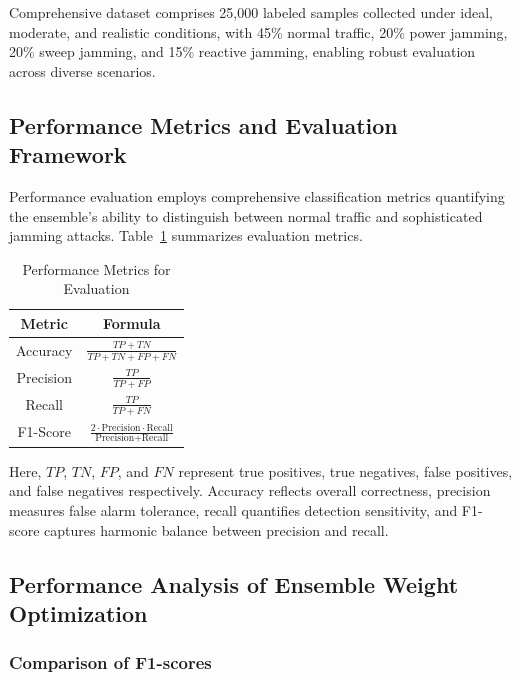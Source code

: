 \documentclass[journal]{IEEEtran}
\begin{document}
Comprehensive dataset comprises 25,000 labeled samples collected under ideal, moderate, and realistic conditions, with 45\% normal traffic, 20\% power jamming, 20\% sweep jamming, and 15\% reactive jamming, enabling robust evaluation across diverse scenarios.

\subsection{Performance Metrics and Evaluation Framework}

Performance evaluation employs comprehensive classification metrics quantifying the ensemble's ability to distinguish between normal traffic and sophisticated jamming attacks. Table~\ref{tab:performance_metrics} summarizes evaluation metrics.

\begin{table}[H]
    \centering \normalsize
    \caption{Performance Metrics for Evaluation}
    \label{tab:performance_metrics}
    \renewcommand{\arraystretch}{1.36}
    \setlength{\tabcolsep}{20pt}
    \begin{tabular}{|c|c|}
        \hline
        \textbf{Metric} & \textbf{Formula} \\
        \hline
        Accuracy & $\frac{TP + TN}{TP + TN + FP + FN}$ \\
        Precision & $\frac{TP}{TP + FP}$ \\
        Recall & $\frac{TP}{TP + FN}$ \\
        F1-Score & $\frac{2 \cdot \text{Precision} \cdot \text{Recall}}{\text{Precision} + \text{Recall}}$ \\
        \hline
    \end{tabular} 
\end{table}

Here, $TP$, $TN$, $FP$, and $FN$ represent true positives, true negatives, false positives, and false negatives respectively. Accuracy reflects overall correctness, precision measures false alarm tolerance, recall quantifies detection sensitivity, and F1-score captures harmonic balance between precision and recall.

\subsection{Performance Analysis of Ensemble Weight Optimization}

\subsubsection{Comparison of F1-scores}
\end{document}
